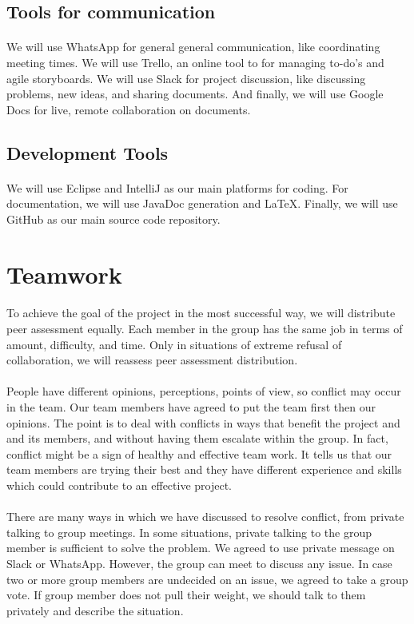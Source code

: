 \documentclass[11pt, a4paper]{article}
\begin{document}
\subsection{Tools for communication}
\paragraph{}
We will use WhatsApp for general general communication, like coordinating meeting times. We will use Trello, an online tool to for managing to-do's and agile storyboards. We will use Slack for project discussion, like discussing problems, new ideas, and sharing documents. And finally, we will use Google Docs for live, remote collaboration on documents.
\subsection{Development Tools}
\paragraph{}
We will use Eclipse and IntelliJ as our main platforms for coding. For documentation, we will use JavaDoc generation and LaTeX. Finally, we will use GitHub as our main source code repository. 

\section{Teamwork}
\paragraph{}
To achieve the goal of the project in the most successful way, we will distribute peer assessment equally. Each member in the group has the same job in terms of amount, difficulty, and time. Only in situations of extreme refusal of collaboration, we will reassess peer assessment distribution.
\paragraph{}
People have different opinions, perceptions, points of view, so conflict may occur in the team. Our team members have agreed to put the team first then our opinions. The point is to deal with conflicts in ways that benefit the project and and its members, and without having them escalate within the group. In fact, conflict might be a sign of healthy and effective team work. It tells us that our team members are trying their best and they have different experience and skills which could contribute to an effective project.
\paragraph{}
There are many ways in which we have discussed to resolve conflict, from private talking to group meetings. In some situations, private talking to the group member is sufficient to solve the problem. We agreed to use private message on Slack or WhatsApp. However, the group can meet to discuss any issue. In case two or more group members are undecided on an issue, we agreed to take a group vote. If group member does not pull their weight, we should talk to them privately and describe the situation. 
\end{document}
